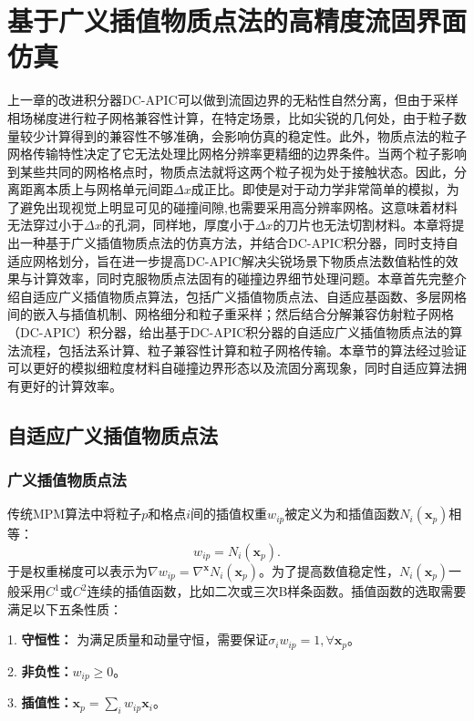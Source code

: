 \chapter{基于广义插值物质点法的高精度流固界面仿真}
上一章的改进积分器DC-APIC可以做到流固边界的无粘性自然分离，但由于采样相场梯度进行粒子网格兼容性计算，在特定场景，比如尖锐的几何处，由于粒子数量较少计算得到的兼容性不够准确，会影响仿真的稳定性。此外，物质点法的粒子网格传输特性决定了它无法处理比网格分辨率更精细的边界条件。当两个粒子影响到某些共同的网格格点时，物质点法就将这两个粒子视为处于接触状态。因此，分离距离本质上与网格单元间距$\Delta x$成正比。即使是对于动力学非常简单的模拟，为了避免出现视觉上明显可见的碰撞间隙,也需要采用高分辨率网格。这意味着材料无法穿过小于$\Delta x$的孔洞，同样地，厚度小于$\Delta x$的刀片也无法切割材料。本章将提出一种基于广义插值物质点法的仿真方法，并结合DC-APIC积分器，同时支持自适应网格划分，旨在进一步提高DC-APIC解决尖锐场景下物质点法数值粘性的效果与计算效率，同时克服物质点法固有的碰撞边界细节处理问题。本章首先完整介绍自适应广义插值物质点算法，包括广义插值物质点法、自适应基函数、多层网格间的嵌入与插值机制、网格细分和粒子重采样；然后结合分解兼容仿射粒子网格（DC-APIC）积分器，给出基于DC-APIC积分器的自适应广义插值物质点法的算法流程，包括法系计算、粒子兼容性计算和粒子网格传输。本章节的算法经过验证可以更好的模拟细粒度材料自碰撞边界形态以及流固分离现象，同时自适应算法拥有更好的计算效率。

\section{自适应广义插值物质点法}

\subsection{广义插值物质点法}
传统MPM算法中将粒子$p$和格点$i$间的插值权重$w_{ip}$被定义为和插值函数$N_i(\mathbf{x}_p)$相等：
\begin{equation}
    w_{ip} = N_i(\mathbf{x}_p).
\end{equation}
于是权重梯度可以表示为$\nabla w_{ip} = \nabla^{\mathbf{x}}N_i(\mathbf{x}_p)$。为了提高数值稳定性，$N_i(\mathbf{x}_p)$一般采用$C^1$或$C^2$连续的插值函数，比如二次或三次B样条函数。插值函数的选取需要满足以下五条性质：

1. \textbf{守恒性：} 为满足质量和动量守恒，需要保证$\sigma_iw_{ip}=1,\forall \mathbf{x}_p$。

2. \textbf{非负性：}$w_{ip}\geq 0$。

3. \textbf{插值性：}$\mathbf{x}_p=\sum_iw_{ip}\mathbf{x}_i$。

